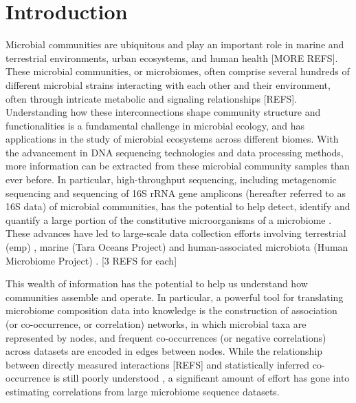 
\section*{Introduction}

  Microbial communities are ubiquitous and play an important role in marine and terrestrial environments, urban ecosystems, and human health \cite{Ghoul2016,Thompson2017} [MORE REFS].
  These microbial communities, or microbiomes, often comprise several hundreds of different microbial strains interacting with each other and their environment, often through intricate metabolic and signaling relationships [REFS].
  Understanding how these interconnections shape community structure and functionalities is a fundamental challenge in microbial ecology, and has applications in the study of microbial ecosystems across different biomes.
  With the advancement in DNA sequencing technologies \cite{Narihiro2017} and data processing methods,  more information can be extracted from these microbial community samples than ever before.
  In particular, high-throughput sequencing, including metagenomic sequencing and sequencing of 16S rRNA gene amplicons (hereafter referred to as 16S data) of microbial communities, has the potential to help detect, identify and quantify a large portion of the constitutive microorganisms of a microbiome \cite{Jovel2016,Lloyd-Price2016}.
  These advances have led to large-scale data collection efforts involving terrestrial (\acl{emp}) \cite{Thompson2017}, marine (Tara Oceans Project) \cite{Zhang2015} and human-associated microbiota (Human Microbiome Project) \cite{HumanMicrobiomeProjectConsortium2012}. [3 REFS for each]

 This wealth of information has the potential to help us understand how communities assemble and operate. In particular, a powerful tool for translating microbiome composition data into knowledge is the construction of association (or co-occurrence, or correlation) networks, in which  microbial taxa are represented by nodes, and frequent co-occurrences (or negative correlations) across datasets are encoded in edges between nodes.
 While the relationship between directly measured interactions [REFS] and statistically inferred co-occurrence is still poorly understood \cite{Zuniga2017}, a significant amount of effort has gone into estimating correlations from large microbiome sequence datasets.
 
